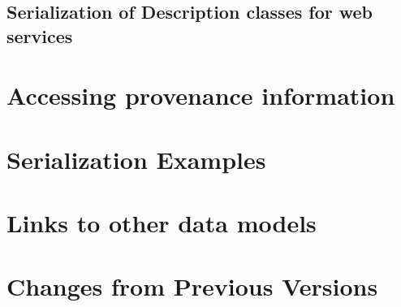 \documentclass[11pt,a4paper]{ivoa}
\begin{document}
\subsection{Serialization of Description classes for web services}
\label{sec:description-serialization}

%

\section{Accessing provenance information}
\label{sec:provaccess}


\begin{appendices}

\section{Serialization Examples}
\label{sec:appendix-serialization-examples}


\section{Links to other data models}
\label{sec:dmlinks}

\clearpage

\section{Changes from Previous Versions}
\label{sec:changes}


\end{appendices}

\listoffigures

\listoftables


\end{document}
